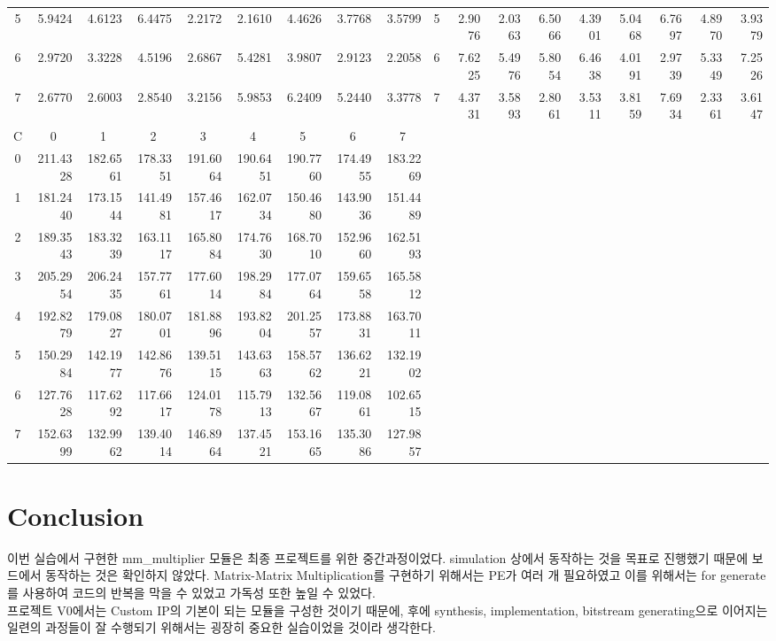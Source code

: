 \documentclass{article}
\begin{document}
\begin{adjustbox}{angle=90}
{\begin{tabular}{|c|rrrrrrrr|c|rrrrrrrr|}
5 & 5.9424 & 4.6123 & 6.4475 & 2.2172 & 2.1610 & 4.4626 & 3.7768 & 3.5799 & 5 & 2.9076 & 2.0363 & 6.5066 & 4.3901 & 5.0468 & 6.7697 & 4.8970 & 3.9379 \\
6 & 2.9720 & 3.3228 & 4.5196 & 2.6867 & 5.4281 & 3.9807 & 2.9123 & 2.2058 & 6 & 7.6225 & 5.4976 & 5.8054 & 6.4638 & 4.0191 & 2.9739 & 5.3349 & 7.2526 \\
7 & 2.6770 & 2.6003 & 2.8540 & 3.2156 & 5.9853 & 6.2409 & 5.2440 & 3.3778 & 7 & 4.3731 & 3.5893 & 2.8061 & 3.5311 & 3.8159 & 7.6934 & 2.3361 & 3.6147 \\ \hline
C & \multicolumn{1}{c}{0} & \multicolumn{1}{c}{1} & \multicolumn{1}{c}{2} & \multicolumn{1}{c}{3} & \multicolumn{1}{c}{4} & \multicolumn{1}{c}{5} & \multicolumn{1}{c}{6} & \multicolumn{1}{c|}{7} &  & \multicolumn{1}{c}{} & \multicolumn{1}{c}{} & \multicolumn{1}{c}{} & \multicolumn{1}{c}{} & \multicolumn{1}{c}{} & \multicolumn{1}{c}{} & \multicolumn{1}{c}{} & \multicolumn{1}{c|}{} \\ \hline
0 & 211.4328 & 182.6561 & 178.3351 & 191.6064 & 190.6451 & 190.7760 & 174.4955 & 183.2269 &  &  &  &  &  &  &  &  &  \\
1 & 181.2440 & 173.1544 & 141.4981 & 157.4617 & 162.0734 & 150.4680 & 143.9036 & 151.4489 &  &  &  &  &  &  &  &  &  \\
2 & 189.3543 & 183.3239 & 163.1117 & 165.8084 & 174.7630 & 168.7010 & 152.9660 & 162.5193 &  &  &  &  &  &  &  &  &  \\
3 & 205.2954 & 206.2435 & 157.7761 & 177.6014 & 198.2984 & 177.0764 & 159.6558 & 165.5812 &  &  &  &  &  &  &  &  &  \\
4 & 192.8279 & 179.0827 & 180.0701 & 181.8896 & 193.8204 & 201.2557 & 173.8831 & 163.7011 &  &  &  &  &  &  &  &  &  \\
5 & 150.2984 & 142.1977 & 142.8676 & 139.5115 & 143.6363 & 158.5762 & 136.6221 & 132.1902 &  &  &  &  &  &  &  &  &  \\
6 & 127.7628 & 117.6292 & 117.6617 & 124.0178 & 115.7913 & 132.5667 & 119.0861 & 102.6515 &  &  &  &  &  &  &  &  &  \\
7 & 152.6399 & 132.9962 & 139.4014 & 146.8964 & 137.4521 & 153.1665 & 135.3086 & 127.9857 &  &  &  &  &  &  &  &  &  \\ \hline
\end{tabular} \newline
}\end{adjustbox}
\hfill
\null

\section{Conclusion}
이번 실습에서 구현한 mm\_multiplier 모듈은 최종 프로젝트를 위한 중간과정이었다. simulation 상에서 동작하는 것을 목표로 진행했기 때문에 보드에서 동작하는 것은 확인하지 않았다. Matrix-Matrix Multiplication를 구현하기 위해서는 PE가 여러 개 필요하였고 이를 위해서는 for generate를 사용하여 코드의 반복을 막을 수 있었고 가독성 또한 높일 수 있었다. \\

프로젝트 V0에서는 Custom IP의 기본이 되는 모듈을 구성한 것이기 때문에, 후에 synthesis, implementation, bitstream generating으로 이어지는 일련의 과정들이 잘 수행되기 위해서는 굉장히 중요한 실습이었을 것이라 생각한다. 




\end{document}

